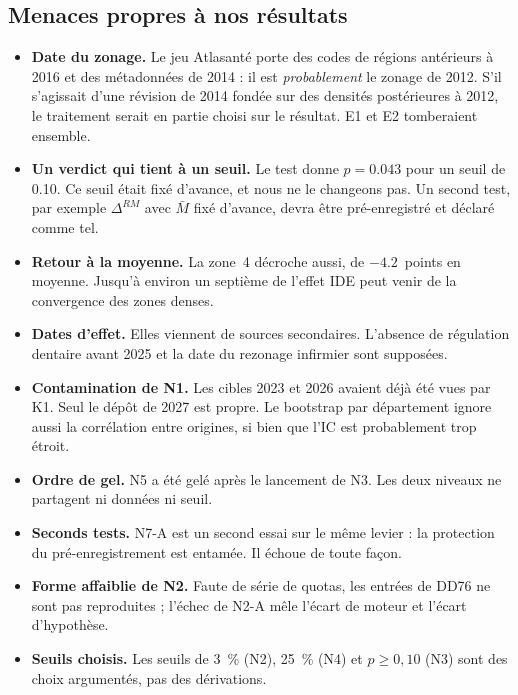 \documentclass[11pt]{article}
\begin{document}
\subsection{Menaces propres à nos résultats}
\begin{itemize}
  \item \textbf{Date du zonage.} Le jeu Atlasanté porte des codes de régions antérieurs à 2016 et
        des métadonnées de 2014 : il est \emph{probablement} le zonage de 2012. S'il s'agissait
        d'une révision de 2014 fondée sur des densités postérieures à 2012, le traitement serait en
        partie choisi sur le résultat. E1 et E2 tomberaient ensemble.
  \item \textbf{Un verdict qui tient à un seuil.} Le test donne $p = \num{0.043}$ pour un seuil de
        \num{0.10}. Ce seuil était fixé d'avance, et nous ne le changeons pas. Un second test, par
        exemple $\Delta^{RM}$ avec $\bar M$ fixé d'avance, devra être pré-enregistré et déclaré
        comme tel.
  \item \textbf{Retour à la moyenne.} La zone~4 décroche aussi, de $-\num{4.2}$\mesure{}~points en
        moyenne. Jusqu'à environ un septième\derive{} de l'effet IDE peut venir de la convergence
        des zones denses.
  \item \textbf{Dates d'effet.} Elles viennent de sources secondaires. L'absence de régulation
        dentaire avant 2025 et la date du rezonage infirmier sont supposées.
  \item \textbf{Contamination de N1.} Les cibles 2023 et 2026 avaient déjà été vues par K1. Seul le
        dépôt de 2027 est propre. Le bootstrap par département ignore aussi la corrélation entre
        origines, si bien que l'IC est probablement trop étroit\suppose{}.
  \item \textbf{Ordre de gel.} N5 a été gelé après le lancement de N3. Les deux niveaux ne partagent
        ni données ni seuil.
  \item \textbf{Seconds tests.} N7-A est un second essai sur le même levier : la protection du
        pré-enregistrement est entamée. Il échoue de toute façon.
  \item \textbf{Forme affaiblie de N2.} Faute de série de quotas, les entrées de DD76 ne sont pas
        reproduites ; l'échec de N2-A mêle l'écart de moteur et l'écart d'hypothèse.
  \item \textbf{Seuils choisis.} Les seuils de 3~\% (N2), 25~\% (N4) et $p \ge 0{,}10$ (N3) sont des
        choix argumentés, pas des dérivations.
\end{itemize}
\end{document}
